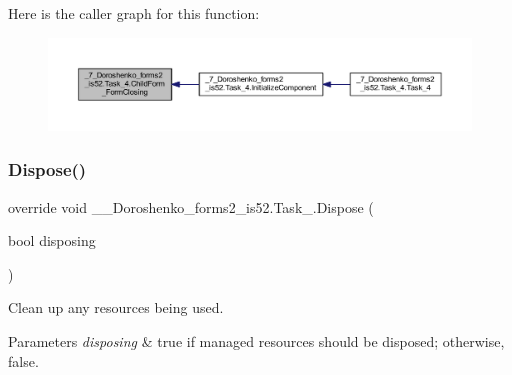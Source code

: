 Here is the caller graph for this function\+:
\nopagebreak
\begin{figure}[H]
\begin{center}
\leavevmode
\includegraphics[width=350pt]{class__7___doroshenko__forms2__is52_1_1_task__4_a554f04a00a6726075b7d99bd45bc2754_icgraph}
\end{center}
\end{figure}
\hypertarget{class__7___doroshenko__forms2__is52_1_1_task__4_a1c7261a0d18d9aff4ab7cb21d13ee353}{}\label{class__7___doroshenko__forms2__is52_1_1_task__4_a1c7261a0d18d9aff4ab7cb21d13ee353} 
\subsubsection{\texorpdfstring{Dispose()}{Dispose()}}
{\footnotesize\ttfamily override void \+\_\+\_\+\+Doroshenko\+\_\+forms2\+\_\+is52.\+Task\+\_.\+Dispose (\begin{DoxyParamCaption}\item[{bool}]{disposing }\end{DoxyParamCaption})\hspace{0.3cm}{\ttfamily [protected]}}



Clean up any resources being used. 


\begin{DoxyParams}{Parameters}
{\em disposing} & true if managed resources should be disposed; otherwise, false.\\
\hline
\end{DoxyParams}
\hypertarget{class__7___doroshenko__forms2__is52_1_1_task__4_a05edfb7213a5950c11b47d82731d3b66}{}\label{class__7___doroshenko__forms2__is52_1_1_task__4_a05edfb7213a5950c11b47d82731d3b66} 
